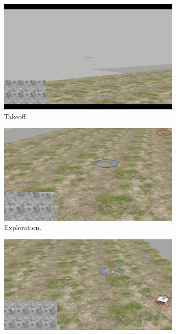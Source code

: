 \begin{figure}[!htbp]
  \centering
   \begin{subfigure}[b]{0.3\textwidth}
        \includegraphics[width=\textwidth]{img/takeoff3.png}
        \caption{Takeoff.}
   \end{subfigure}
   \begin{subfigure}[b]{0.3\textwidth}
        \includegraphics[width=\textwidth]{img/exploring3.png}
        \caption{Exploration.}
        \label{fig:two}
   \end{subfigure}
    \begin{subfigure}[b]{0.3\textwidth}
        \includegraphics[width=\textwidth]{img/following3.png}

\end{subfigure}
\end{figure}
